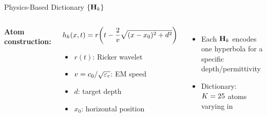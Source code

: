 \begin{frame}{Physics-Based Dictionary $\{\mathbf{H}_{k}\}$}

  \begin{columns}[T]
      \vspace{0.3em}

      \textbf{Atom construction:}

      \vspace{0.2em}
      \begin{shibuiframe}{ }
        \small
        \[
          h_{k}(x,t) = r\!\left(t - \frac{2}{v}\sqrt{(x - x_0)^2 + d^2}\right)
        \]
        \vspace{0.1em}
        \begin{itemize}
          \setlength{\itemsep}{0.05em}
          \item $r(t)$: Ricker wavelet
          \item $v = c_0/\sqrt{\varepsilon_r}$: EM speed
          \item $d$: target depth
          \item $x_0$: horizontal position
        \end{itemize}
      \end{shibuiframe}

      \vspace{0.3em}
      \begin{itemize}
        \setlength{\itemsep}{0.08em}
        \item Each $\mathbf{H}_{k}$ encodes one hyperbola for a specific depth/permittivity
        \item Dictionary: $K = 25$ atoms varying in 
      \end{itemize}

      \vspace{0.3em}

      \vspace{0.3em}
      \centering
  \end{columns}
\end{frame}

